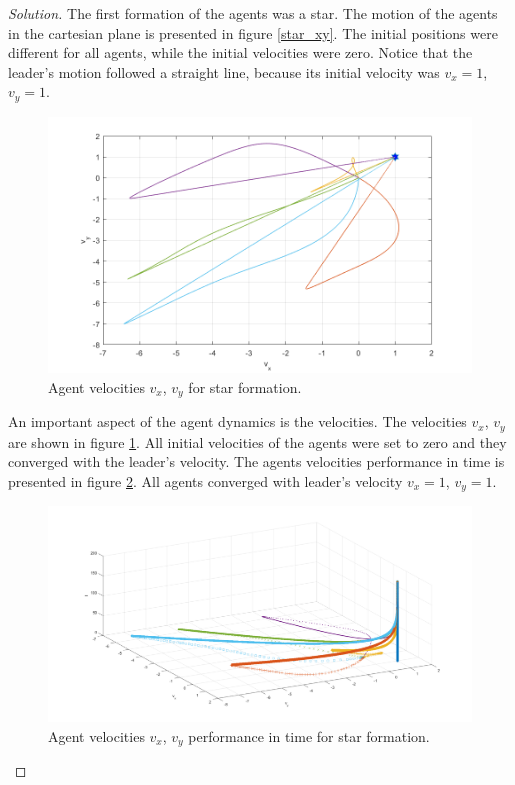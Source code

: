 \documentclass[12pt]{article}
\newenvironment{solution}{\begin{proof}[Solution]}{\end{proof}}
\begin{document}
\begin{solution}
The first formation of the agents was a star. The motion of the agents in the cartesian plane is presented in figure \ref{star_xy}. The initial positions were different for all agents, while the initial velocities were zero. Notice that the leader's motion followed a straight line, because its initial velocity was $v_x=1$, $v_y=1$.
\begin{figure}[!h]
	\includegraphics[scale=0.41]{figures/StarVelocities2D.png}
	\centering
	\caption{Agent velocities $v_x$, $v_y$ for star formation.}
	\label{starVel}
\end{figure}

An important aspect of the agent dynamics is the velocities. The velocities $v_x$, $v_y$ are shown in figure \ref{starVel}. All initial velocities of the agents were set to zero and they converged with the leader's velocity.  The agents velocities performance in time is presented in figure \ref{starVel_3D}. All agents converged with leader's velocity $v_x=1$, $v_y=1$.

\begin{figure}[!h]
	\includegraphics[scale=0.34]{figures/StarVelocities3D.png}
	\centering
	\caption{Agent velocities $v_x$, $v_y$ performance in time for star formation.}
	\label{starVel_3D}
\end{figure}
 

\end{solution}
\end{document}
